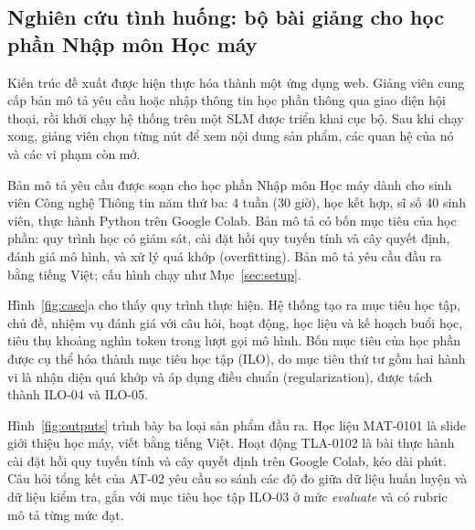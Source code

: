 \documentclass[conference,a4paper]{IEEEtran}
\begin{document}
\subsection{Nghiên cứu tình huống: bộ bài giảng cho học phần Nhập môn Học máy}
\label{sec:case}

Kiến trúc đề xuất được hiện thực hóa thành một ứng dụng web. Giảng viên cung cấp bản mô tả yêu cầu hoặc nhập thông tin
học phần thông qua giao diện hội thoại, rồi khởi chạy hệ thống trên một SLM được triển khai cục bộ. Sau khi chạy xong, giảng viên chọn từng nút
để xem nội dung sản phẩm, các quan hệ của nó và các vi phạm còn mở.

Bản mô tả yêu cầu được soạn cho học phần Nhập môn Học máy dành cho sinh viên Công nghệ
Thông tin năm thứ ba: 4 tuần (30 giờ), học kết hợp, sĩ số 40 sinh viên, thực hành Python
trên Google Colab. Bản mô tả có bốn mục tiêu của học phần: quy trình học có giám sát, cài đặt hồi
quy tuyến tính và cây quyết định, đánh giá mô hình, và xử lý quá khớp (overfitting). Bản mô tả yêu cầu đầu ra
bằng tiếng Việt; cấu hình chạy như Mục~\ref{sec:setup}.

Hình~\ref{fig:case}a cho thấy quy trình thực hiện. Hệ thống tạo ra \caseObj{} mục tiêu học tập, \caseMod{}
chủ đề, \caseTask{} nhiệm vụ đánh giá với \caseItem{} câu hỏi, \caseAct{} hoạt động,
\caseMat{} học liệu và \caseSess{} kế hoạch buổi học, tiêu thụ khoảng \caseTok{} nghìn token trong \caseCalls{}
lượt gọi mô hình. Bốn mục tiêu của học phần được cụ thể hóa thành \caseObj{} mục tiêu học tập (ILO),
do mục tiêu thứ tư gồm hai hành vi là nhận diện quá khớp và áp dụng điều chuẩn (regularization),
được tách thành ILO-04 và ILO-05.

Hình~\ref{fig:outputs} trình bày ba loại sản phẩm đầu ra. Học liệu MAT-0101 là slide giới thiệu
học máy, viết bằng tiếng Việt. Hoạt động TLA-0102 là bài thực hành cài đặt hồi quy tuyến tính
và cây quyết định trên Google Colab, kéo dài \caseActMinutes{} phút. Câu hỏi tổng kết của AT-02 yêu cầu so sánh
các độ đo giữa dữ liệu huấn luyện và dữ liệu kiểm tra, gắn với mục tiêu học tập ILO-03 ở mức
\emph{evaluate} và có rubric mô tả từng mức đạt.
\end{document}
